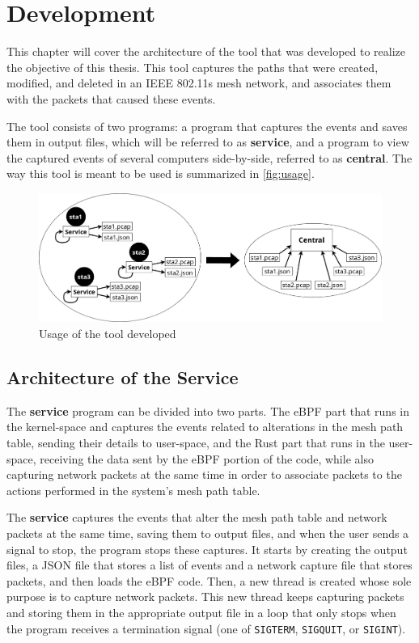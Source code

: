 \chapter{Development}\label{chap:devel}

This chapter will cover the architecture of the tool that was developed to
realize the objective of this thesis. This tool captures the paths that were
created, modified, and deleted in an \ac{IEEE} 802.11s mesh network, and
associates them with the packets that caused these events.

The tool consists of two programs: a program that captures the events and saves
them in output files, which will be referred to as \textbf{service}, and a
program to view the captured events of several computers side-by-side, referred
to as \textbf{central}. The way this tool is meant to be used is summarized in
\autoref{fig:usage}.

\begin{figure}[htb]
   \centering
   \includegraphics[scale=.225]{usage}
   \caption{Usage of the tool developed}\label{fig:usage}
\end{figure}


\section{Architecture of the Service}\label{sect:archser}

The \textbf{service} program can be divided into two parts. The eBPF part that
runs in the kernel-space and captures the events related to alterations in the
mesh path table, sending their details to user-space, and the Rust part that
runs in the user-space, receiving the data sent by the eBPF portion of the code,
while also capturing network packets at the same time in order to associate
packets to the actions performed in the system's mesh path table.

The \textbf{service} captures the events that alter the mesh path table and
network packets at the same time, saving them to output files, and when the user
sends a signal to stop, the program stops these captures. It starts by creating
the output files, a JSON file that stores a list of events and a network capture
file that stores packets, and then loads the eBPF code. Then, a new thread is
created whose sole purpose is to capture network packets. This new thread keeps
capturing packets and storing them in the appropriate output file in a loop that
only stops when the program receives a termination signal (one of
\texttt{SIGTERM}, \texttt{SIGQUIT}, or \texttt{SIGINT}).

